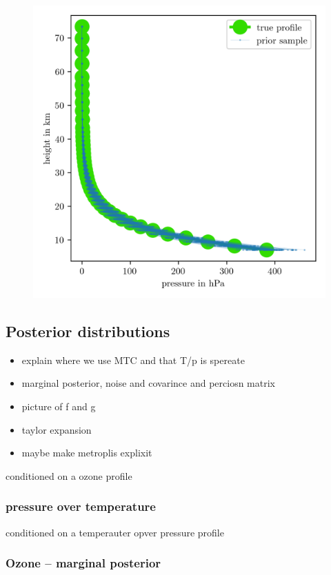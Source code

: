 \begin{figure}[ht!]
	\centering
	\includegraphics{PriorPressPostMeanSigm.png}
	\caption[]{}
	\label{fig:}
\end{figure}


\subsection{Posterior distributions}
\begin{itemize}
	\item explain where we use MTC and that T/p is spereate
	\item marginal posterior, noise and covarince and perciosn matrix
	\item picture of f and g
	\item taylor expansion
	\item maybe make  metroplis explixit
\end{itemize}
conditioned on a ozone profile
\subsubsection{pressure over temperature}

conditioned on a temperauter opver pressure profile
\subsubsection{Ozone -- marginal posterior}
